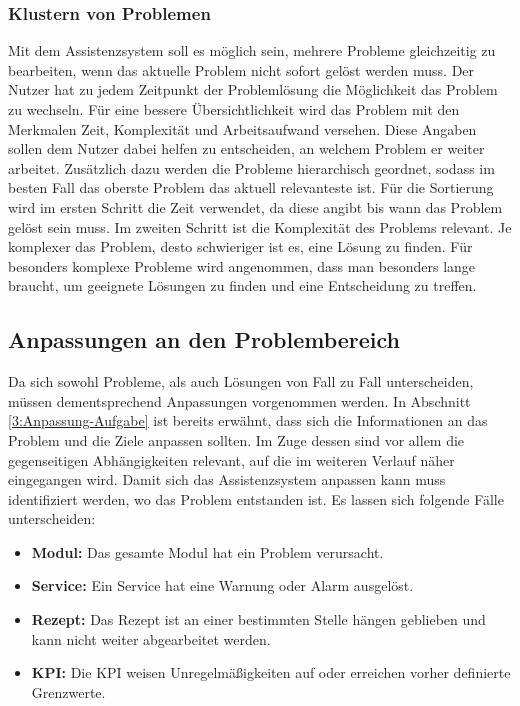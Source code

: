 \subsubsection*{Klustern von Problemen}
Mit dem Assistenzsystem soll es möglich sein, mehrere Probleme gleichzeitig zu bearbeiten, wenn das aktuelle Problem nicht sofort gelöst werden muss. Der Nutzer hat zu jedem Zeitpunkt der Problemlösung die Möglichkeit das Problem zu wechseln. Für eine bessere Übersichtlichkeit wird das Problem mit den Merkmalen Zeit, Komplexität und Arbeitsaufwand versehen. Diese Angaben sollen dem Nutzer dabei helfen zu entscheiden, an welchem Problem er weiter arbeitet. Zusätzlich dazu werden die Probleme hierarchisch geordnet, sodass im besten Fall das oberste Problem das aktuell relevanteste ist. Für die Sortierung wird im ersten Schritt die Zeit verwendet, da diese angibt bis wann das Problem gelöst sein muss. Im zweiten Schritt ist die Komplexität des Problems relevant. Je komplexer das Problem, desto schwieriger ist es, eine Lösung zu finden. Für besonders komplexe Probleme wird angenommen, dass man besonders lange braucht, um geeignete Lösungen zu finden und eine Entscheidung zu treffen. 

\subsection{Anpassungen an den Problembereich}
\label{4:Anpassung-Problembereich}
Da sich sowohl Probleme, als auch Lösungen von Fall zu Fall unterscheiden, müssen dementsprechend Anpassungen vorgenommen werden. In Abschnitt \ref{3:Anpassung-Aufgabe} ist bereits erwähnt, dass sich die Informationen an das Problem und die Ziele anpassen sollten. Im Zuge dessen sind vor allem die gegenseitigen Abhängigkeiten relevant, auf die im weiteren Verlauf näher eingegangen wird. Damit sich das Assistenzsystem anpassen kann muss identifiziert werden, wo das Problem entstanden ist. Es lassen sich folgende Fälle unterscheiden:
\begin{itemize}
\item \textbf{Modul:} Das gesamte Modul hat ein Problem verursacht.
\item \textbf{Service:} Ein Service hat eine Warnung oder Alarm ausgelöst.
\item \textbf{Rezept:} Das Rezept ist an einer bestimmten Stelle hängen geblieben und kann nicht weiter abgearbeitet werden.
\item \textbf{KPI:} Die KPI weisen Unregelmäßigkeiten auf oder erreichen vorher definierte Grenzwerte.
\end{itemize}


